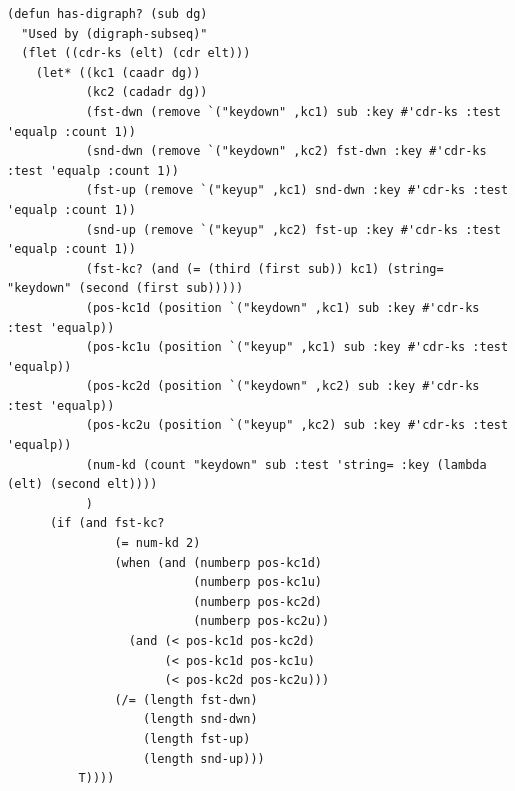 \begin{lstlisting}[frame=single]
 (defun has-digraph? (sub dg)
  "Used by (digraph-subseq)"
  (flet ((cdr-ks (elt) (cdr elt)))
    (let* ((kc1 (caadr dg))
           (kc2 (cadadr dg))
           (fst-dwn (remove `("keydown" ,kc1) sub :key #'cdr-ks :test 'equalp :count 1))
           (snd-dwn (remove `("keydown" ,kc2) fst-dwn :key #'cdr-ks :test 'equalp :count 1))
           (fst-up (remove `("keyup" ,kc1) snd-dwn :key #'cdr-ks :test 'equalp :count 1))
           (snd-up (remove `("keyup" ,kc2) fst-up :key #'cdr-ks :test 'equalp :count 1))
           (fst-kc? (and (= (third (first sub)) kc1) (string= "keydown" (second (first sub)))))
           (pos-kc1d (position `("keydown" ,kc1) sub :key #'cdr-ks :test 'equalp))
           (pos-kc1u (position `("keyup" ,kc1) sub :key #'cdr-ks :test 'equalp))
           (pos-kc2d (position `("keydown" ,kc2) sub :key #'cdr-ks :test 'equalp))
           (pos-kc2u (position `("keyup" ,kc2) sub :key #'cdr-ks :test 'equalp))
           (num-kd (count "keydown" sub :test 'string= :key (lambda (elt) (second elt))))
           )
      (if (and fst-kc?
               (= num-kd 2)
               (when (and (numberp pos-kc1d)
                          (numberp pos-kc1u)
                          (numberp pos-kc2d)
                          (numberp pos-kc2u))
                 (and (< pos-kc1d pos-kc2d)
                      (< pos-kc1d pos-kc1u)
                      (< pos-kc2d pos-kc2u)))
               (/= (length fst-dwn)
                   (length snd-dwn)
                   (length fst-up)
                   (length snd-up)))
          T))))
\end{lstlisting}


